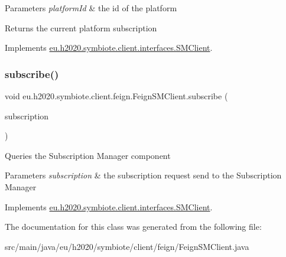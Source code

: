 \begin{DoxyParams}{Parameters}
{\em platform\+Id} & the id of the platform \\
\hline
\end{DoxyParams}
\begin{DoxyReturn}{Returns}
the current platform subscription 
\end{DoxyReturn}


Implements \hyperlink{interfaceeu_1_1h2020_1_1symbiote_1_1client_1_1interfaces_1_1SMClient_a1b8fae6186f8126666879346e752fc6c}{eu.\+h2020.\+symbiote.\+client.\+interfaces.\+S\+M\+Client}.

\mbox{\label{classeu_1_1h2020_1_1symbiote_1_1client_1_1feign_1_1FeignSMClient_a0eeaef7f9775704b578f5d3101f28b1f}} 
\subsubsection{\texorpdfstring{subscribe()}{subscribe()}}
{\footnotesize\ttfamily void eu.\+h2020.\+symbiote.\+client.\+feign.\+Feign\+S\+M\+Client.\+subscribe (\begin{DoxyParamCaption}\item[{\hyperlink{classeu_1_1h2020_1_1symbiote_1_1cloud_1_1model_1_1internal_1_1Subscription}{Subscription}}]{subscription }\end{DoxyParamCaption})}

Queries the Subscription Manager component


\begin{DoxyParams}{Parameters}
{\em subscription} & the subscription request send to the Subscription Manager \\
\hline
\end{DoxyParams}


Implements \hyperlink{interfaceeu_1_1h2020_1_1symbiote_1_1client_1_1interfaces_1_1SMClient_ac9e9feeade418ab9df8e3bbed2f31d0b}{eu.\+h2020.\+symbiote.\+client.\+interfaces.\+S\+M\+Client}.



The documentation for this class was generated from the following file\+:\begin{DoxyCompactItemize}
\item 
src/main/java/eu/h2020/symbiote/client/feign/Feign\+S\+M\+Client.\+java\end{DoxyCompactItemize}
